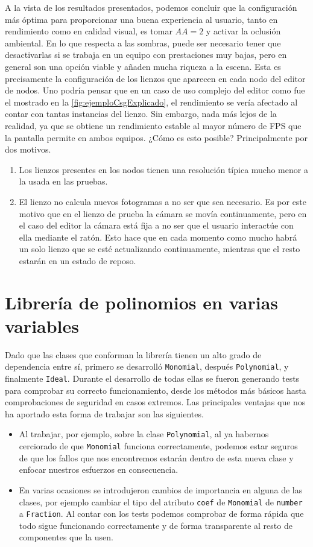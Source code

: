 A la vista de los resultados presentados, podemos concluir que la configuración más óptima para proporcionar una buena experiencia al usuario, tanto en rendimiento como en calidad visual, es tomar $AA=2$ y activar la oclusión ambiental. En lo que respecta a las sombras, puede ser necesario tener que desactivarlas si se trabaja en un equipo con prestaciones muy bajas, pero en general son una opción viable y añaden mucha riqueza a la escena. Esta es precisamente la configuración de los lienzos que aparecen en cada nodo del editor de nodos. Uno podría pensar que en un caso de uso complejo del editor como fue el mostrado en la \autoref{fig:ejemploCsgExplicado}, el rendimiento se vería afectado al contar con tantas instancias del lienzo. Sin embargo, nada más lejos de la realidad, ya que se obtiene un rendimiento estable al mayor número de FPS que la pantalla permite en ambos equipos. ¿Cómo es esto posible? Principalmente por dos motivos.
\begin{enumerate}
    \item Los lienzos presentes en los nodos tienen una resolución típica mucho menor a la usada en las pruebas.
    \item El lienzo no calcula nuevos fotogramas a no ser que sea necesario. Es por este motivo que en el lienzo de prueba la cámara se movía continuamente, pero en el caso del editor la cámara está fija a no ser que el usuario interactúe con ella mediante el ratón. Esto hace que en cada momento como mucho habrá un solo lienzo que se esté actualizando continuamente, mientras que el resto estarán en un estado de reposo.
\end{enumerate}

\section{Librería de polinomios en varias variables}\label{sec:libreria}
Dado que las clases que conforman la librería tienen un alto grado de dependencia entre sí, primero se desarrolló \texttt{Monomial}, después \texttt{Polynomial}, y finalmente \texttt{Ideal}. Durante el desarrollo de todas ellas se fueron generando tests para comprobar su correcto funcionamiento, desde los métodos más básicos hasta comprobaciones de seguridad en casos extremos. Las principales ventajas que nos ha aportado esta forma de trabajar son las siguientes.
\begin{itemize}
    \item Al trabajar, por ejemplo, sobre la clase \texttt{Polynomial}, al ya habernos cerciorado de que \texttt{Monomial} funciona correctamente, podemos estar seguros de que los fallos que nos encontremos estarán dentro de esta nueva clase y enfocar nuestros esfuerzos en consecuencia.
    \item En varias ocasiones se introdujeron cambios de importancia en alguna de las clases, por ejemplo cambiar el tipo del atributo \texttt{coef} de \texttt{Monomial} de \texttt{number} a \texttt{Fraction}. Al contar con los tests podemos comprobar de forma rápida que todo sigue funcionando correctamente y de forma transparente al resto de componentes que la usen.
\end{itemize}

